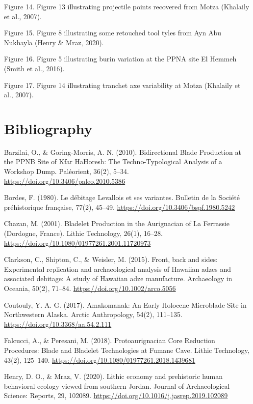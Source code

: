 \documentclass[
]{article}
\begin{document}
Figure 14. Figure 13 illustrating projectile points recovered from Motza
(Khalaily et al., 2007).

Figure 15. Figure 8 illustrating some retouched tool tyles from Ayn Abu
Nukhayla (Henry \& Mraz, 2020).

Figure 16. Figure 5 illustrating burin variation at the PPNA site El
Hemmeh (Smith et al., 2016).

Figure 17. Figure 14 illustrating tranchet axe variability at Motza
(Khalaily et al., 2007).

\hypertarget{bibliography}{%
\section{Bibliography}\label{bibliography}}

\noindent \vspace{-2em} \setlength{\parindent}{-0.5in}
\setlength{\leftskip}{0.5in} \setlength{\parskip}{15pt}

Barzilai, O., \& Goring-Morris, A. N. (2010). Bidirectional Blade
Production at the PPNB Site of Kfar HaHoresh: The Techno-Typological
Analysis of a Workshop Dump. Paléorient, 36(2), 5--34.
\url{https://doi.org/10.3406/paleo.2010.5386}

Bordes, F. (1980). Le débitage Levallois et ses variantes. Bulletin de
la Société préhistorique française, 77(2), 45--49.
\url{https://doi.org/10.3406/bspf.1980.5242}

Chazan, M. (2001). Bladelet Production in the Aurignacian of La
Ferrassie (Dordogne, France). Lithic Technology, 26(1), 16--28.
\url{https://doi.org/10.1080/01977261.2001.11720973}

Clarkson, C., Shipton, C., \& Weisler, M. (2015). Front, back and sides:
Experimental replication and archaeological analysis of Hawaiian adzes
and associated debitage: A study of Hawaiian adze manufacture.
Archaeology in Oceania, 50(2), 71--84.
\url{https://doi.org/10.1002/arco.5056}

Coutouly, Y. A. G. (2017). Amakomanak: An Early Holocene Microblade Site
in Northwestern Alaska. Arctic Anthropology, 54(2), 111--135.
\url{https://doi.org/10.3368/aa.54.2.111}

Falcucci, A., \& Peresani, M. (2018). Protoaurignacian Core Reduction
Procedures: Blade and Bladelet Technologies at Fumane Cave. Lithic
Technology, 43(2), 125--140.
\url{https://doi.org/10.1080/01977261.2018.1439681}

Henry, D. O., \& Mraz, V. (2020). Lithic economy and prehistoric human
behavioral ecology viewed from southern Jordan. Journal of
Archaeological Science: Reports, 29, 102089.
\url{https://doi.org/10.1016/j.jasrep.2019.102089}
\end{document}
